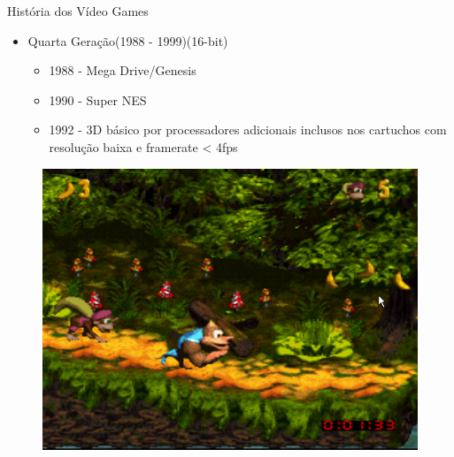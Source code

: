 \documentclass[xcolor=svgnames,handout]{beamer}
\begin{document}
\begin{frame}{História dos Vídeo Games}
\begin{itemize}
	\item Quarta Geração(1988 - 1999)(16-bit)\pause
	\begin{itemize}
	\item 1988 - Mega Drive/Genesis\pause
	\item 1990 - Super NES\pause
	\item 1992 - 3D básico por processadores adicionais inclusos nos cartuchos com resolução baixa e framerate < 4fps\pause
	
	\end{itemize}
		\end{itemize}
		\begin{figure}[t]
	    \centering
		    \includegraphics[scale=0.3]{imagens/dk3}
		\end{figure}
	\end{frame}
	
\end{document}
